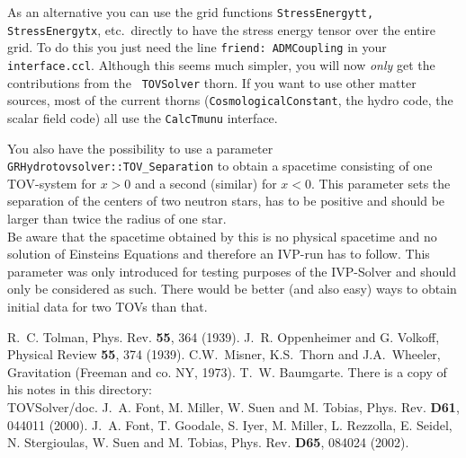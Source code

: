 As an alternative you can use the grid functions {\tt StressEnergytt,
  StressEnergytx}, etc.~directly to have the stress energy tensor over
the entire grid. To do this you just need the line {\tt friend:
  ADMCoupling} in your {\tt interface.ccl}. Although this seems much
simpler, you will now \emph{only} get the contributions from the {\tt
  TOVSolver} thorn. If you want to use other matter sources, most of
the current thorns ({\tt CosmologicalConstant}, the hydro code, the
scalar field code) all use the {\tt CalcTmunu} interface.

You also have the possibility to use a parameter
{\tt GRHydrotovsolver::TOV\_Separation} to obtain a spacetime consisting
of one TOV-system for $x>0$ and a second (similar) for $x<0$. This parameter
sets the separation of the centers of two neutron stars, has to be positive
and should be larger than twice the radius of one star.\\
Be aware that the spacetime obtained by this is no physical spacetime and
no solution of Einsteins Equations and therefore an IVP-run has to follow.
This parameter was only introduced for testing purposes of the IVP-Solver
and should only be considered as such. There would be better (and also easy)
ways to obtain initial data for two TOVs than that.





\begin{thebibliography}{10}

R.~C. Tolman, Phys. Rev. {\bf 55}, 364 (1939).
%
J.~R. Oppenheimer and G. Volkoff, Physical Review {\bf 55}, 374 (1939).
%
C.W.~Misner, K.S.~Thorn and J.A.~Wheeler, Gravitation (Freeman and co. NY, 1973).
%
T.~W. Baumgarte. There is a copy of his notes in this directory: \\
TOVSolver/doc.
%
J.~A. Font, M. Miller, W. Suen and M. Tobias, Phys. Rev. {\bf D61},
044011 (2000).
%
J.~A. Font, T. Goodale, S. Iyer, M. Miller, L. Rezzolla, E. Seidel,
N. Stergioulas, W. Suen and M. Tobias, Phys. Rev. {\bf D65},
084024 (2002).


\end{thebibliography}




